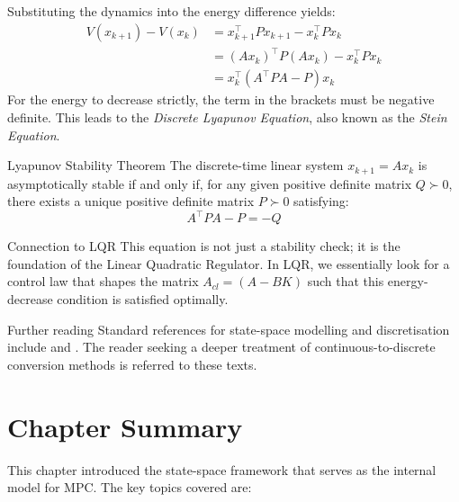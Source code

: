 Substituting the dynamics into the energy difference yields:
\begin{align*}
	V(x_{k+1}) - V(x_k) &= x_{k+1}^\top P x_{k+1} - x_k^\top P x_k \\
	&= (A x_k)^\top P (A x_k) - x_k^\top P x_k \\
	&= x_k^\top (A^\top P A - P) x_k
\end{align*}
For the energy to decrease strictly, the term in the brackets must be negative definite. This leads to the \emph{Discrete Lyapunov Equation}, also known as the \textit{Stein Equation}.

\begin{alertbox}{Lyapunov Stability Theorem}
	The discrete-time linear system $x_{k+1} = A x_k$ is asymptotically stable if and only if, for any given positive definite matrix $Q \succ 0$, there exists a unique positive definite matrix $P \succ 0$ satisfying:
	\begin{equation*}
		A^\top P A - P = -Q
	\end{equation*}
\end{alertbox}

\begin{notebox}{Connection to LQR}
	This equation is not just a stability check; it is the foundation of the Linear Quadratic Regulator. In LQR, we essentially look for a control law that shapes the matrix $A_{cl} = (A-BK)$ such that this energy-decrease condition is satisfied optimally.
\end{notebox}

\begin{notebox}{Further reading}
Standard references for state-space modelling and discretisation include \citet{Ogata2010} and \citet{Franklin2015}. The reader seeking a deeper treatment of continuous-to-discrete conversion methods is referred to these texts.
\end{notebox}

\section{Chapter Summary}

This chapter introduced the state-space framework that serves as the internal model for MPC. The key topics covered are:


